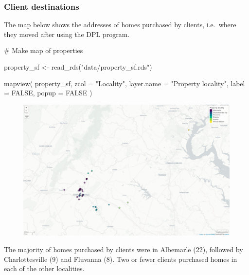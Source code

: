 \documentclass[
  letterpaper,
  DIV=11,
  numbers=noendperiod]{scrartcl}
\newenvironment{Shaded}{\begin{snugshade}}{\end{snugshade}}
\newcommand{\AttributeTok}[1]{\textcolor[rgb]{0.40,0.45,0.13}{#1}}
\newcommand{\CommentTok}[1]{\textcolor[rgb]{0.37,0.37,0.37}{#1}}
\newcommand{\ConstantTok}[1]{\textcolor[rgb]{0.56,0.35,0.01}{#1}}
\newcommand{\FunctionTok}[1]{\textcolor[rgb]{0.28,0.35,0.67}{#1}}
\newcommand{\NormalTok}[1]{\textcolor[rgb]{0.00,0.23,0.31}{#1}}
\newcommand{\OtherTok}[1]{\textcolor[rgb]{0.00,0.23,0.31}{#1}}
\newcommand{\StringTok}[1]{\textcolor[rgb]{0.13,0.47,0.30}{#1}}
\begin{document}
\hypertarget{client-destinations}{%
\subsubsection{Client destinations}\label{client-destinations}}

The map below shows the addresses of homes purchased by clients,
i.e.~where they moved after using the DPL program.

\begin{Shaded}
\begin{Highlighting}[]
\CommentTok{\# Make map of properties}

\NormalTok{property\_sf }\OtherTok{\textless{}{-}} \FunctionTok{read\_rds}\NormalTok{(}\StringTok{"data/property\_sf.rds"}\NormalTok{)}

\FunctionTok{mapview}\NormalTok{(}
\NormalTok{  property\_sf,}
  \AttributeTok{zcol =} \StringTok{"Locality"}\NormalTok{,}
  \AttributeTok{layer.name =} \StringTok{"Property locality"}\NormalTok{,}
  \AttributeTok{label =} \ConstantTok{FALSE}\NormalTok{,}
  \AttributeTok{popup =} \ConstantTok{FALSE}
\NormalTok{)}
\end{Highlighting}
\end{Shaded}

\begin{figure}[H]

{\centering \includegraphics{piedmont_files/figure-pdf/property-map-1.pdf}

}

\end{figure}

The majority of homes purchased by clients were in Albemarle (22),
followed by Charlottesville (9) and Fluvanna (8). Two or fewer clients
purchased homes in each of the other localities.
\end{document}
